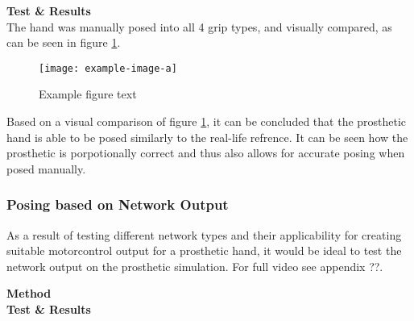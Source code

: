 \documentclass[../main.tex]{subfiles}
\begin{document}
\textbf{Test \& Results}\\

The hand was manually posed into all 4 grip types, and visually compared, as can be seen in figure  \ref{fig:hand_pose_test}.

\begin{figure}[h]
\begin{center}
\texttt{[image: example-image-a]}
\caption{Example figure text}
\label{fig:hand_pose_test}
\end{center}
\end{figure}

Based on a visual comparison of figure \ref{fig:hand_pose_test}, it can be concluded that the prosthetic hand is able to be posed similarly to the real-life refrence.
It can be seen how the prosthetic is porpotionally correct and thus also allows for accurate posing when posed manually.

\subsubsection{Posing based on Network Output}

As a result of testing different network types and their applicability for creating suitable motorcontrol output for a prosthetic hand, it would be ideal to test the network output on the prosthetic simulation.
For full video see appendix ??.

\textbf{Method}\\

\textbf{Test \& Results}\\





\end{document}
